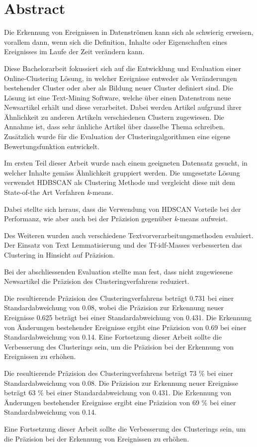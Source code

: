 
\section*{Abstract}

Die Erkennung von Ereignissen in Datenströmen kann sich als schwierig erweisen, vorallem dann,
wenn sich die Definition, Inhalte oder Eigenschaften eines Ereignisses im Laufe der Zeit verändern kann.

Diese Bachelorarbeit fokussiert sich auf die Entwicklung und Evaluation einer Online-Clustering Lösung,
in welcher Ereignisse entweder als Veränderungen bestehender Cluster oder aber als Bildung neuer Cluster
definiert sind.
Die Lösung ist eine Text-Mining Software, welche über einen Datenstrom neue Newsartikel erhält
und diese verarbeitet.
Dabei werden Artikel aufgrund ihrer Ähnlichkeit zu anderen Artikeln verschiedenen Clustern zugewiesen.
Die Annahme ist, dass sehr änhliche Artikel über dasselbe Thema schreiben.
Zusätzlich wurde für die Evaluation der Clusteringalgorithmen eine eigene Bewertungsfunktion entwickelt.

Im ersten Teil dieser Arbeit wurde nach einem geeigneten Datensatz gesucht,
in welcher Inhalte gemäss Ähnlichkeit gruppiert werden.
Die umgesetzte Lösung verwendet HDBSCAN als Clustering Methode und vergleicht diese
mit dem State-of-the Art Verfahren \textit{k}-means.

Dabei stellte sich heraus, dass die Verwendung von HDSCAN Vorteile bei der Performanz,
wie aber auch bei der Präzision gegenüber \textit{k}-means aufweist.

Des Weiteren wurden auch verschiedene Textvorverarbeitungsmethoden evaluiert.
Der Einsatz von Text Lemmatisierung und des Tf-idf-Masses verbesserten
das Clustering in Hinsicht auf Präzision.

Bei der abschliessenden Evaluation stellte man fest,
dass nicht zugewiesene Newsartikel die Präzision des Clusteringverfahrens reduziert.

Die resultierende Präzision des Clusteringverfahrens beträgt 0.731 bei einer Standardabweichung von 0.08,
wobei die Präzision zur Erkennung neuer Ereignisse 0.625 beträgt bei einer Standardabweichung von 0.431.
Die Erkennung von Änderungen bestehender Ereignisse ergibt eine Präzision von 0.69 bei einer Standardabweichung von 0.14.
Eine Fortsetzung dieser Arbeit sollte die Verbesserung des Clusterings sein,
um die Präzision bei der Erkennung von Ereignissen zu erhöhen.

Die resultierende Präzision des Clusteringverfahrens beträgt 73 \% bei einer Standardabweichung von 0.08.
Die Präzision zur Erkennung neuer Ereignisse beträgt 63 \% bei einer Standardabweichung von 0.431.
Die Erkennung von Änderungen bestehender Ereignisse ergibt eine Präzision von 69 \% bei einer Standardabweichung von 0.14.

Eine Fortsetzung dieser Arbeit sollte die Verbesserung des Clusterings sein,
um die Präzision bei der Erkennung von Ereignissen zu erhöhen.
